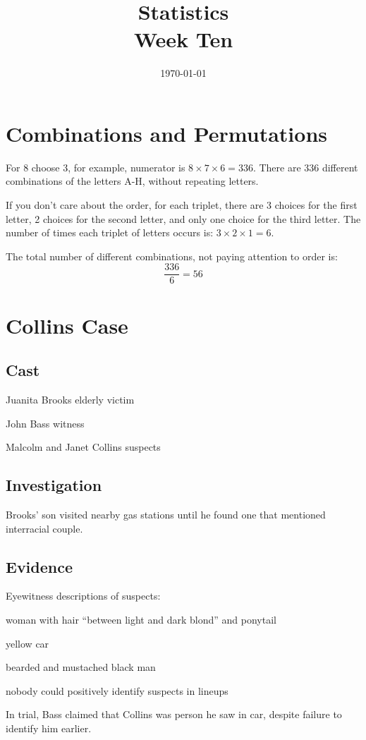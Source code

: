 \documentclass[letterpaper, landscape]{exam}
\title{Statistics \\ Week Ten}
\date{\today}
\author{}
\begin{document}
  \maketitle
  \tableofcontents

  \section{Combinations and Permutations}

  For 8 choose 3, for example, numerator is $8 \times 7 \times 6 = 336$.
  There are 336 different combinations of the letters A-H, without
  repeating letters.

  If you don't care about the order, for each triplet, there are 3 choices for
  the first letter, 2 choices for the second letter, and only one choice for the
  third letter. The number of times each triplet of letters occurs is: 
  $3 \times 2 \times 1 = 6$.

  The total number of different combinations, not paying attention to order is:
  \[
    \frac{336}{6} = 56
  \]

  \section{Collins Case}

  \subsection{Cast}
  \begin{description*}
    \item[Juanita Brooks] elderly victim
    \item[John Bass] witness
    \item[Malcolm and Janet Collins] suspects
  \end{description*}

  \subsection{Investigation}
  Brooks' son visited nearby gas stations until he found one that mentioned
  interracial couple.

  \subsection{Evidence}
  Eyewitness descriptions of suspects:
  \begin{itemize*}
    \item woman with hair ``between light and dark blond'' and ponytail
    \item yellow car
    \item bearded and mustached black man
    \item nobody could positively identify suspects in lineups
    \item In trial, Bass claimed that Collins was person he saw in car, despite
      failure to identify him earlier.
  \end{itemize*}
\end{document}
